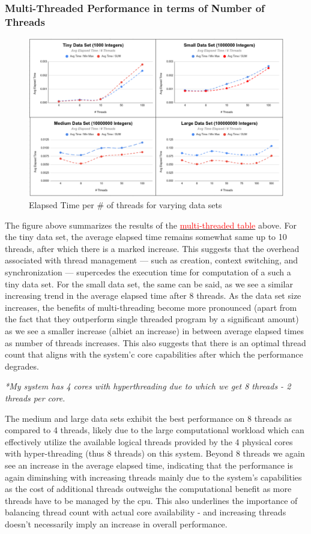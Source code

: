 \documentclass{article}
\theoremstyle{mytheoremstyle}
\theoremstyle{mytheoremstyle}
\theoremstyle{myproblemstyle}
\begin{document}
\subsubsection*{Multi-Threaded Performance in terms of Number of Threads}
\begin{figure}[htbp]
  \centering
  \includegraphics[width=1.0\textwidth]{multi_thread.png}
  \caption{Elapsed Time per \# of threads for varying data sets}
\end{figure}
The figure above summarizes the results of the \hyperref[fig:multitimes]{\textcolor{red}{multi-threaded table}} above.
For the tiny data set, the average elapsed time remains somewhat same up to 10 threads, after which there is a marked increase. This suggests that the overhead associated with thread management — such as creation, context switching, and synchronization — supercedes the execution time for computation of a such a tiny data set.  For the small data set, the same can be said, as we see a similar increasing trend in the average elapsed time after 8 threads. As the data set size increases, the benefits of multi-threading become more pronounced (apart from the fact that they outperform single threaded program by a significant amount) as we see a smaller increase (albiet an increase) in between average elapsed times as number of threads increases. This also suggests that there is an optimal thread count that aligns with the system'c core capabilities after which the performance degrades.

\textit{*My system has 4 cores with hyperthreading due to which we get 8 threads - 2 threads per core.}

The medium and large data sets exhibit the best performance on 8 threads as compared to 4 threads, likely due to the large computational workload which can effectively utilize the available logical threads provided by the 4 physical cores with hyper-threading (thus 8 threads) on this system. Beyond 8 threads we again see an increase in the average elapsed time, indicating that the performance is again diminshing with increasing threads mainly due to the system's capabilities as the cost of additional threads outweighs the computational benefit as more threads have to be managed by the cpu. This also underlines the importance of balancing thread count with actual core availability - and increasing threads doesn't necessarily imply an increase in overall performance.
\end{document}
